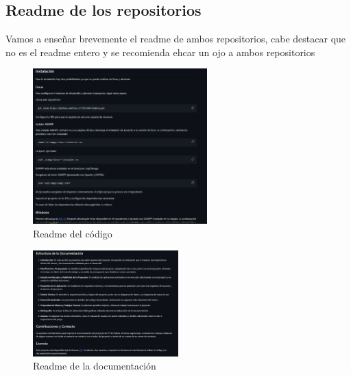 \documentclass[a4paper]{article}
\begin{document}
\subsection{Readme de los repositorios}
Vamos a enseñar brevemente el readme de ambos repositorios, cabe destacar que no es el readme entero y se recomienda ehcar un ojo a ambos repositorios
\begin{figure}[ht]
    \centering
    \includegraphics[width=0.6\textwidth]{Images/readmecodigorepo.png}
    \caption{Readme del código}
    \label{fig:repocodreadme}
\end{figure}
\begin{figure}[ht]
    \centering
    \includegraphics[width=0.5\textwidth]{Images/readmedocumentation.png}
    \caption{Readme de la documentación}
    \label{fig:documentacionreporeadme}
\end{figure}

\clearpage
\end{document}
